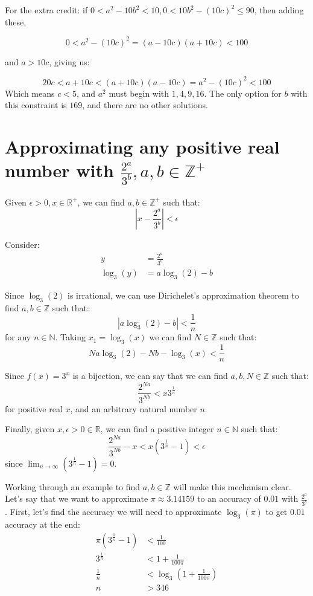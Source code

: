 \documentclass{article}
\begin{document}
For the extra credit: if $0<a^2-10b^2 <10, 0<10b^2 - (10c)^2 \leq 90$, then adding these,

\[0 < a^2 - (10c)^2 = (a-10c)(a+10c) < 100 \]

and $a > 10c$, giving us:

\[ 20c < a+10c < (a+10c)(a-10c) = a^2 - (10c)^2 < 100 \]
Which means $c < 5$, and $a^2$ must begin with $1,4,9,16$. The only option for $b$ with this
constraint is $169$, and there are no other solutions.

\section{Approximating any positive real number with $\frac{2^a}{3^b}, a,b \in \mathbb{Z}^+$}

Given $\epsilon>0, x \in \mathbb{R}^+$, we can find $a,b \in \mathbb{Z}^+$ such that:
\[ \left|x - \frac{2^a}{3^b} \right| < \epsilon \]

Consider:
\begin{align*}
	y &= \frac{2^a}{3^b} \\
	\log_3(y) &= a\log_3(2) - b
\end{align*}

Since $\log_3(2)$ is irrational, we can use Dirichelet's approximation theorem to find
$a,b \in \mathbb{Z}$ such that:
\[ \left| a\log_3(2) - b \right| < \frac{1}{n} \]
for any $n \in \mathbb{N}$. Taking $x_1 = \log_3(x)$ we can find $N \in \mathbb{Z}$ such
that:
\[  Na\log_3(2) - Nb - \log_3(x) < \frac{1}{n} \] 

Since $f(x) = 3^x$ is a bijection, we can say that we can find $a,b,N \in \mathbb{Z}$ such that:
\[ \frac{2^{Na}}{3^{Nb}} < x3^{\frac{1}{n}} \]
for positive real $x$, and an arbitrary natural number $n$.

Finally, given $x, \epsilon > 0 \in \mathbb{R}$, we can find a positive integer $n \in \mathbb{N}$ such that:
\[ \frac{2^{Na}}{3^{Nb}} - x  < x(3^{\frac{1}{n}} - 1) < \epsilon  \]
since $\lim_{n \to \infty} (3^{\frac{1}{n}} - 1) = 0$.

Working through an example to find $a,b \in \mathbb{Z}$ will make this mechanism clear. Let's say that we want
to approximate $\pi \approx 3.14159$ to an accuracy of $0.01$ with $\frac{2^a}{3^b}$. First, let's find the
accuracy we will need to approximate $\log_3(\pi)$ to get $0.01$ accuracy at the end:
\begin{align*}
	\pi(3^{\frac{1}{n}} - 1) &< \frac{1}{100} \\
	3^{\frac{1}{n}} &< 1 + \frac{1}{100\pi} \\
	\frac{1}{n} &< \log_3(1 + \frac{1}{100\pi}) \\
	n &> 346
\end{align*}
\end{document}
